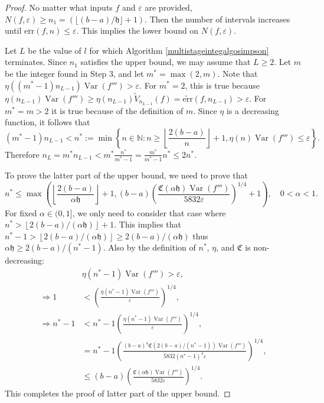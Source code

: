 \documentclass[draft]{iitthesis}
\DeclareMathOperator{\Var}{Var}
\theoremstyle{definition}
\theoremstyle{remark}
\begin{document}
\begin{proof}
  No matter what inputs $f$ and $\varepsilon$ are provided, $N(f,\varepsilon)\ge n_1=(\lfloor (b-a)/\mathfrak{h}\rfloor+1)$. Then the number of intervals increases until $\overline{\text{err}}(f,n)\le\varepsilon$. This implies the lower bound on $N(f,\varepsilon)$.

  Let $L$ be the value of $l$ for which Algorithm \ref{multistageintegalgosimpson} terminates. Since $n_1$ satisfies the upper bound, we may assume that $L \ge 2$. Let $m$ be the integer found in Step 3, and let $m^*=\max(2,m)$. Note that $\eta((m^*-1)n_{L-1})\Var(f''')>\varepsilon$. For $m^*=2$, this is true because $\eta(n_{L-1})\Var(f''')\ge\eta(n_{L-1})\widetilde{V}_{n_{L-1}}(f)=\widetilde{\text{err}}(f,n_{L-1})>\varepsilon$. For $m^*=m>2$ it is true because of the definition of $m$. Since $\eta$ is a decreasing function, it follows that
  $$(m^*-1)n_{L-1}<n^*:=\min\left\{n\in\mathbb{N}:n\ge\left\lfloor\frac{2(b-a)}{n}\right\rfloor+1,\eta(n)\Var(f''')\le\varepsilon\right\}.$$
  Therefore $n_L=m^*n_{L-1}<m^*\frac{n^*}{m^*-1}=\frac{m^*}{m^*-1}n^*\le2n^*$.

  To prove the latter part of the upper bound, we need to prove that
  $$n^*\leq\max\left(\left\lfloor\frac{2(b-a)}{\alpha\mathfrak{h}}\right\rfloor+1,(b-a)\left(\frac{\mathfrak{C}(\alpha\mathfrak{h})\Var(f''')}{5832\varepsilon}\right)^{1/4}+1\right),\quad 0<\alpha<1.$$
  For fixed $\alpha\in(0,1]$, we only need to consider that case where $n^*>\left\lfloor2(b-a)/(\alpha\mathfrak{h})\right\rfloor+1$. This implies that $n^*-1>\left\lfloor2(b-a)/(\alpha\mathfrak{h})\right\rfloor\ge 2(b-a)/(\alpha\mathfrak{h})$ thus $\alpha\mathfrak{h}\ge2(b-a)/(n^*-1)$. Also by the definition of $n^*$, $\eta$, and $\mathfrak{C}$ is non-decreasing:
  \begin{align*}
    &\eta(n^*-1)\Var(f''')>\varepsilon, \\
    \Rightarrow 1&<\left(\frac{\eta(n^*-1)\Var(f''')}{\varepsilon}\right)^{1/4},\\
    \Rightarrow n^*-1&<n^*-1\left(\frac{\eta(n^*-1)\Var(f''')}{\varepsilon}\right)^{1/4},\\
    &=n^*-1\left(\frac{(b-a)^4\mathfrak{C}(2(b-a)/(n^*-1))\Var(f''')}{5832(n^*-1)^4\varepsilon}\right)^{1/4},\\
    &\le(b-a)\left(\frac{\mathfrak{C}(\alpha\mathfrak{h})\Var(f''')}{5832\varepsilon}\right)^{1/4}.
  \end{align*}
  This completes the proof of latter part of the upper bound.
\end{proof}
\end{document}

